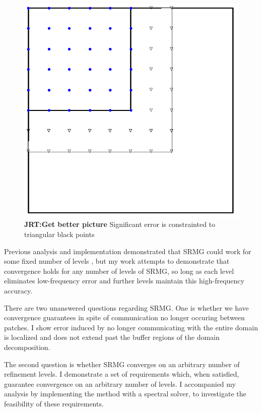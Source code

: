 \documentclass[final]{siamart1116}
\numberwithin{theorem}{section}
\begin{document}
\begin{figure}
  \begin{center}
    \includegraphics[scale=0.4]{sketchsr.pdf}
  \end{center}
  \caption*{\textbf{JRT:Get better picture} \footnotesize{Significant error is constrainted to triangular black points}}
\end{figure}


	Previous analysis and implementation demonstrated that SRMG could work for some fixed number of levels \cite{paper1}, but my work attempts to demonstrate that convergence holds for any number of levels of SRMG, so long as each level eliminates low-frequency error and further levels maintain this high-frequency accuracy. 
    
	There are two unanswered questions regarding SRMG. One is whether we have convergence guarantees in spite of communication no longer occuring between patches.  I show error induced by no longer communicating with the entire domain is localized and does not extend past the buffer regions of the domain decomposition. 
    
	The second question is whether SRMG converges on an arbitrary number of refinement levels. I demonstrate a set of requirements which, when satisfied, guarantee convergence on an arbitrary number of levels. I accompanied my analysis by implementing the method with a spectral solver, to investigate the feasibility of these requirements. 
    
\end{document}
